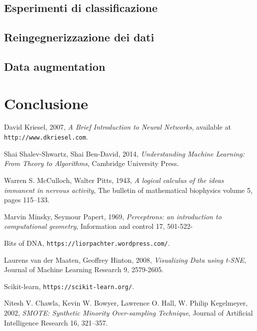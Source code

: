 \documentclass[12pt, twoside, letterpaper]{report}
\begin{document}
	\section{Esperimenti di classificazione}
	\section{Reingegnerizzazione dei dati}
	\section{Data augmentation}

	\chapter*{Conclusione}	  
	
	\begin{thebibliography}{9}
		 David Kriesel, 2007, \textit{A Brief Introduction to Neural Networks}, available at \texttt{http://www.dkriesel.com}.

		 Shai Shalev-Shwartz, Shai Ben-David, 2014, \textit{Understanding Machine Learning: From Theory to Algorithms}, Cambridge University Press.
		
		 Warren S. McCulloch, Walter Pitts, 1943, \textit{A logical calculus of the ideas immanent in nervous activity}, The bulletin of mathematical biophysics volume 5, pages 115–133.		
		
		 Marvin Minsky, Seymour Papert, 1969,  \textit{Perceptrons: an introduction to computational geometry}, Information and control 17, 501-522- 
		
		 Bits of DNA, \texttt{https://liorpachter.wordpress.com/}.
		
		 Laurens van der Maaten, Geoffrey Hinton, 2008, \textit{Visualizing Data using t-SNE}, Journal of Machine Learning Research 9, 2579-2605.
		
		 Scikit-learn, \texttt{https://scikit-learn.org/}.
		
		 Nitesh V. Chawla, Kevin W. Bowyer, Lawrence O. Hall, W. Philip Kegelmeyer, 2002, \textit{SMOTE: Synthetic Minority Over-sampling Technique}, Journal of Artificial Intelligence Research 16, 321–357.
		

		
	\end{thebibliography}
	
\end{document}
